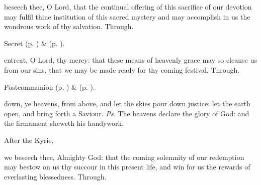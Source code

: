 
\secret
{} beseech thee, O Lord, that the continual offering of this sacrifice of our devotion may fulfil thine institution of this sacred mystery and may accomplish in us the wondrous work of thy salvation. Through.

\begin{rubric}
     Secret  (p. \pageref{AdventISecret}) \&   (p. \pageref{SPMaryInAdvent}).
\end{rubric}


\postcommunion
{} entreat, O Lord, thy mercy: that these means of heavenly grace may so cleanse us from our sins, that we may be made ready for thy coming festival. Through.

\begin{rubric}
     Postcommunion  (p. \pageref{AdventIPostcommunion}) \&   (p. \pageref{SPMaryInAdvent}).
\end{rubric}


\clearpage
{}


\introit
{} down, ye heavens, from above, and let the skies pour down justice: let the earth open, and bring forth a Saviour. \textit{Ps.} The heavens declare the glory of God: and the firmament sheweth his handywork.
\begin{rubric}
    After the Kyrie,
\end{rubric}
\collect
{} we beseech thee, Almighty God: that the coming solemnity of our redemption may bestow on us thy succour in this present life, and win for us the rewards of everlasting blessedness. Through.

